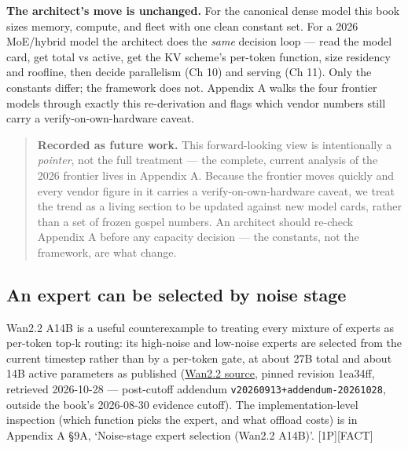 \textbf{The architect's move is unchanged.} For the canonical dense
model this book sizes memory, compute, and fleet with one clean constant
set. For a 2026 MoE/hybrid model the architect does the \emph{same}
decision loop --- read the model card, get total vs active, get the KV
scheme's per-token function, size residency and roofline, then decide
parallelism (Ch 10) and serving (Ch 11). Only the constants differ; the
framework does not. Appendix A walks the four frontier models through
exactly this re-derivation and flags which vendor numbers still carry a
verify-on-own-hardware caveat.

\begin{quote}
\textbf{Recorded as future work.} This forward-looking view is
intentionally a \emph{pointer}, not the full treatment --- the complete,
current analysis of the 2026 frontier lives in Appendix A. Because the
frontier moves quickly and every vendor figure in it carries a
verify-on-own-hardware caveat, we treat the trend as a living section to
be updated against new model cards, rather than a set of frozen gospel
numbers. An architect should re-check Appendix A before any capacity
decision --- the constants, not the framework, are what change.
\end{quote}

\subsection{An expert can be selected by noise
stage}\label{an-expert-can-be-selected-by-noise-stage}

Wan2.2 A14B is a useful counterexample to treating every mixture of
experts as per-token top-k routing: its high-noise and low-noise experts
are selected from the current timestep rather than by a per-token gate,
at about 27B total and about 14B active parameters as published
(\href{https://github.com/Wan-Video/Wan2.2/tree/1ea34ff48f87168174e12956e200b1d908b1c5ff}{Wan2.2
source}, pinned revision 1ea34ff, retrieved 2026-10-28 --- post-cutoff
addendum \texttt{v20260913+addendum-20261028}, outside the book's
2026-08-30 evidence cutoff). The implementation-level inspection (which
function picks the expert, and what offload costs) is in Appendix A §9A,
`Noise-stage expert selection (Wan2.2 A14B)'. \mbox{{[}1P{]}}\hspace{0pt}\mbox{{[}FACT{]}}

